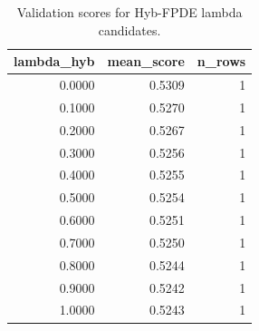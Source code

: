 \begin{table}[t]
\caption{Validation scores for Hyb-FPDE lambda candidates.}
\label{tab:lambda_distribution_computed}
\centering
\begin{tabular}{rrr}
\toprule
lambda\_hyb & mean\_score & n\_rows \\
\midrule
0.0000 & 0.5309 & 1 \\
0.1000 & 0.5270 & 1 \\
0.2000 & 0.5267 & 1 \\
0.3000 & 0.5256 & 1 \\
0.4000 & 0.5255 & 1 \\
0.5000 & 0.5254 & 1 \\
0.6000 & 0.5251 & 1 \\
0.7000 & 0.5250 & 1 \\
0.8000 & 0.5244 & 1 \\
0.9000 & 0.5242 & 1 \\
1.0000 & 0.5243 & 1 \\
\bottomrule
\end{tabular}

\end{table}
